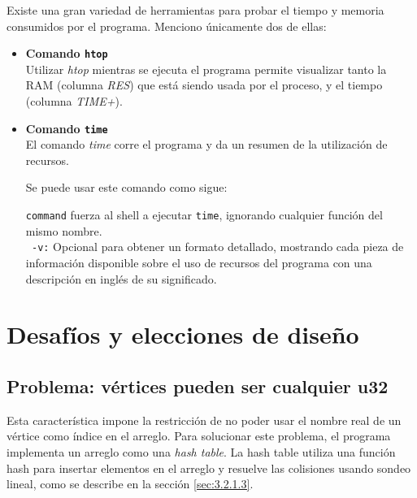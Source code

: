 \documentclass[11pt,a4paper]{article}
\theoremstyle{plain}
\begin{document}
Existe una gran variedad de herramientas para probar el tiempo y memoria consumidos por el programa. Menciono únicamente dos de ellas:\\
\begin{itemize}
\item\textbf{Comando \texttt{htop}}\\

 Utilizar \emph{htop} mientras se ejecuta el programa permite visualizar tanto la RAM (columna \emph{RES}) que está siendo usada por el proceso, y el tiempo (columna \emph{TIME+}).\\

\item\textbf{Comando \texttt{time}}\\

El comando \emph{time} corre el programa y da un resumen de la utilización de recursos.

Se puede usar este comando como sigue:


\begin{quote}
\end{quote}

\texttt{command} fuerza al shell a ejecutar \texttt{time}, ignorando cualquier función del mismo nombre.\\

\texttt{ -v:} Opcional para obtener un formato detallado, mostrando cada pieza de información disponible sobre el uso de recursos del programa con una descripción en inglés de su significado.

\end{itemize}

\section{Desafíos y elecciones de diseño}

	\subsection{Problema: vértices pueden ser cualquier u32}

Esta característica impone la restricción de no poder usar el nombre real de un vértice como índice en el arreglo. Para solucionar este problema, el programa implementa un arreglo como una \emph{hash table}. La hash table utiliza una función hash para insertar elementos en el arreglo y resuelve las colisiones usando sondeo lineal, como se describe en la sección \ref{sec:3.2.1.3}.
\end{document}
